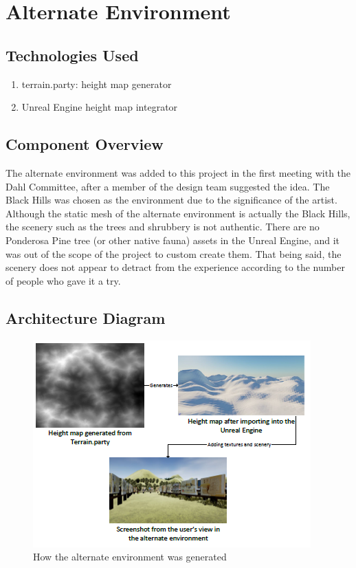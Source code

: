 \section{Alternate Environment}

\subsection{Technologies Used}
\begin{enumerate}
\item terrain.party:  height map generator
\item Unreal Engine height map integrator
\end{enumerate}

\subsection{Component Overview}
The alternate environment was added to this project in the first meeting with the Dahl Committee, after a member of the design team suggested the idea.  The Black Hills was chosen as the environment due to the significance of the artist. 
Although the static mesh of the alternate environment is actually the Black Hills, the scenery such as the trees and shrubbery is not authentic.  There are no Ponderosa Pine tree (or other native fauna) assets in the Unreal Engine, and it was out of the scope of the project to custom create them.  That being said, the scenery does not appear to detract from the experience according to the number of people who gave it a try.


\subsection{Architecture Diagram}
\begin{figure}
\includegraphics[scale=1.0]{Diagrams/AltEnvironment.png}
\centering
\caption{How the alternate environment was generated}
\end{figure}

